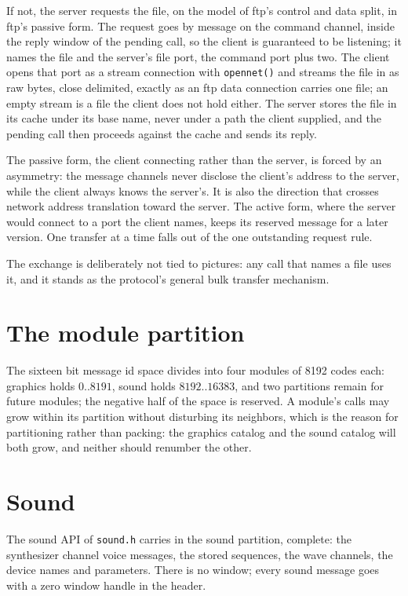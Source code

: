 \documentclass[11pt]{article}
\begin{document}
If not, the server requests the file, on the model of ftp's control and
data split, in ftp's passive form. The request goes by message on the
command channel, inside the reply window of the pending call, so the
client is guaranteed to be listening; it names the file and the server's
file port, the command port plus two. The client opens that port as a
stream connection with \texttt{opennet()} and streams the file in as raw
bytes, close delimited, exactly as an ftp data connection carries one
file; an empty stream is a file the client does not hold either. The
server stores the file in its cache under its base name, never under a
path the client supplied, and the pending call then proceeds against the
cache and sends its reply.

The passive form, the client connecting rather than the server, is forced
by an asymmetry: the message channels never disclose the client's address
to the server, while the client always knows the server's. It is also the
direction that crosses network address translation toward the server. The
active form, where the server would connect to a port the client names,
keeps its reserved message for a later version. One transfer at a time
falls out of the one outstanding request rule.

The exchange is deliberately not tied to pictures: any call that names a
file uses it, and it stands as the protocol's general bulk transfer
mechanism.

\section{The module partition}

The sixteen bit message id space divides into four modules of 8192 codes
each: graphics holds $0..8191$, sound holds $8192..16383$, and two
partitions remain for future modules; the negative half of the space is
reserved. A module's calls may grow within its partition without
disturbing its neighbors, which is the reason for partitioning rather
than packing: the graphics catalog and the sound catalog will both grow,
and neither should renumber the other.

\section{Sound}

The sound API of \texttt{sound.h} carries in the sound partition,
complete: the synthesizer channel voice messages, the stored sequences,
the wave channels, the device names and parameters. There is no window;
every sound message goes with a zero window handle in the header.
\end{document}
